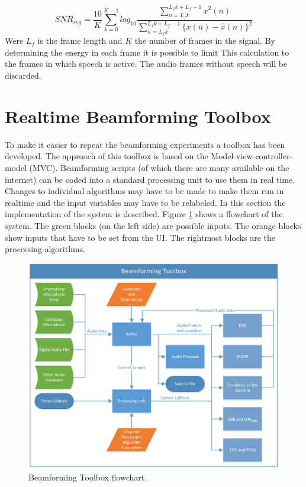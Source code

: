 \begin{equation}
SNR_{seg} = \frac{10}{K} \sum_{k=0}^{K-1} log_{10} \frac{\sum_{n=L_{f}k}^{L_{f}k+L_{f}-1} x^2(n)}{\sum_{n=L_{f}k}^{L_{f}k+L_{f}-1} \{x(n)-\hat{x}(n)\}^2}
\end{equation}
Were $L_{f}$ is the frame length and $K$ the number of frames in the signal. By determining the energy in each frame it is possible to limit This calculation to the frames in which speech is active. The audio frames without speech will be discarded.


\section{Realtime Beamforming Toolbox}
\label{sec:des_gui}
To make it easier to repeat the beamforming experiments a \matlab toolbox has been developed. The approach of this toolbox is based on the Model-view-controller-model (MVC). Beamforming scripts (of which there are many available on the internet) can be coded into a standard processing unit to use them in real time. Changes to individual algorithms may have to be made to make them run in realtime and the input variables may have to be relabeled. \newline
In this section the implementation of the system is described. Figure \ref{fig:UI_schematic} shows a flowchart of the system. The green blocks (on the left side) are possible inputs. The orange blocks show inputs that have to be set from the UI. The rightmost blocks are the processing algorithms.

\begin{figure}
    \centering
       \includegraphics[scale = 0.6, clip = true]{images/beamforming_UI_schemetic.png} %
    \caption[Beamforming Toolbox flowchart]{Beamforming Toolbox flowchart.}
    \label{fig:UI_schematic}
\end{figure}

